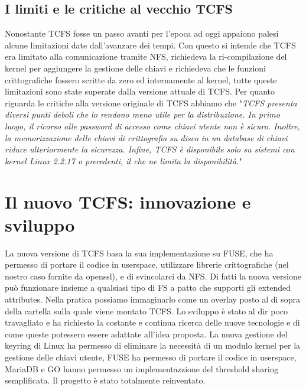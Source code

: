 \subsection{I limiti e le critiche al vecchio TCFS} 
Nonostante TCFS fosse un passo avanti per l'epoca ad oggi appaiono palesi alcune limitazioni date dall'avanzare dei tempi. Con questo si intende che TCFS era limitato alla comunicazione tramite NFS, richiedeva la ri-compilazione del kernel per aggiungere la gestione delle chiavi e richiedeva che le funzioni crittografiche fossero scritte da zero ed internamente al kernel, tutte queste limitazioni sono state superate dalla versione attuale di TCFS. Per quanto riguarda le critiche alla versione originale di TCFS abbiamo che "\textit{TCFS presenta diversi punti deboli che lo rendono meno utile per la distribuzione. In primo luogo, il ricorso alle password di accesso come chiavi utente non è sicuro. Inoltre, la memorizzazione delle chiavi di crittografia su disco in un database di chiavi riduce ulteriormente la sicurezza. Infine, TCFS è disponibile solo su sistemi con kernel Linux 2.2.17 o precedenti, il che ne limita la disponibilità.}"\cite{AnalisiDiDiversiFS}


\section{Il nuovo TCFS: innovazione e sviluppo} 
La nuova versione di TCFS basa la sua implementazione su FUSE, che ha permesso di portare il codice in userspace, utilizzare librerie crittografiche (nel nostro caso fornite da openssl), e di svincolarci da NFS. Di fatti la nuova versione può funzionare insieme a qualsiasi tipo di FS a patto che supporti gli extended attributes. Nella pratica possiamo immaginarlo come un overlay posto al di sopra della cartella sulla quale viene montato TCFS. Lo sviluppo è stato al dir poco travagliato e ha richiesto la costante e continua ricerca delle nuove tecnologie e di come queste potessero essere adattate all'idea proposta. La nuova gestione del keyring di Linux ha permesso di eliminare la necessità di un modulo kernel per la gestione delle chiavi utente, FUSE ha permesso di portare il codice in userspace, MariaDB e GO hanno permesso un implementazzione del threshold sharing semplificata. Il progetto è stato totalmente reinventato.

